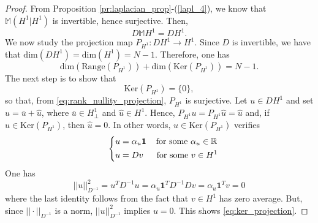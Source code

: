 \documentclass[a4paper]{article}
\theoremstyle{plain}
\begin{document}
\begin{proof}
	From Proposition \ref{pr:laplacian_prop}-(\ref{lapl_4}), we know that $\mathbb{M}(H^1|H^1)$ is invertible, hence surjective. Then,
	\begin{equation*}
	D\mathbb{M} H^1 = D H^1.
	\end{equation*}
	We now study the projection map ${P}_{H^1}:DH^1\rightarrow H^1$. Since $D$ is invertible, we have that $\mathrm{dim}(D H^1) = \mathrm{dim}(H^1) = N-1$. Therefore, one has
	\begin{equation}
	\label{eq:rank_nullity_projection}
	\mathrm{dim}(\mathrm{Range}({{P}_{H^1}})) + 	\mathrm{dim}(\mathrm{Ker}({{P}_{H^1}})) = N-1.
	\end{equation}
	The next step is to show that 
	\begin{equation}
	\label{eq:ker_projection}
	\mathrm{Ker}({P}_{H^1}) = \{0\}, 
	\end{equation}
	so that, from \eqref{eq:rank_nullity_projection}, ${P}_{H^1}$ is surjective. Let $u\in DH^1$ and set $u = \bar{u} + \hat{u}$, where $\bar{u}\in H^1_{\perp}$ and $\hat{u} \in H^1$. Hence, ${P}_{H^1}u = {P}_{H^1}\hat{u} = \hat{u}$ and, if $u\in\mathrm{Ker}({P}_{H^1})$, then $\hat{u}=0$. In other words, $u\in\mathrm{Ker}({P}_{H^1})$ verifies
	\begin{equation*}
	\label{eq:ler_projection}
	\quad\left\lbrace
	\begin{aligned}
	u &= \alpha_u\mathbf{1}\hspace{4mm}\text{for some }\alpha_u\in\mathbb{R}\\
	u &= Dv\hspace{5.5mm}\text{for some }v\in H^1\\
	\end{aligned}
	\right.
	\end{equation*}
	One has
	\begin{equation*}
	||u||^{2}_{D^{-1}} = u^T D^{-1}u = \alpha_{u}\mathbf{1}^T D^{-1}D v = \alpha_{u}\mathbf{1}^T v = 0
	\end{equation*}
	where the last identity follows from the fact that $v\in H^1$ has zero average. But, since $||\cdot||_{D^{-1}}$ is a norm, $||u||^{2}_{D^{-1}}$ implies $u=0$. This shows \eqref{eq:ker_projection}.
\end{proof}
\end{document}
